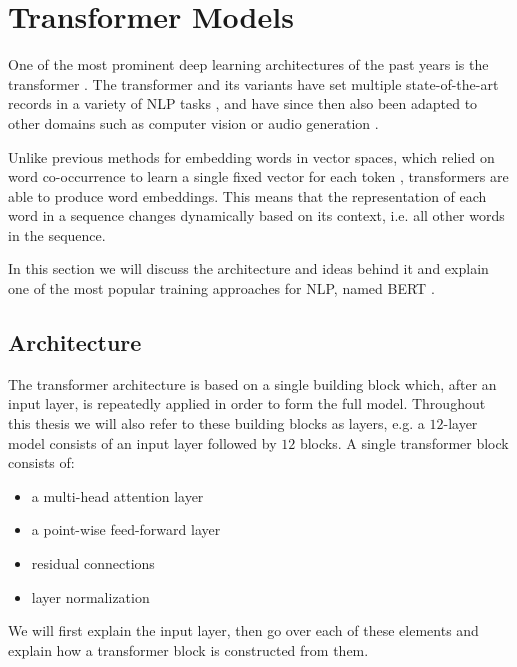 \section{Transformer Models}
One of the most prominent deep learning architectures of the past years is the transformer \cite{vaswani2017attention}. The transformer and its variants have set multiple state-of-the-art records in a variety of NLP tasks \cite{devlin-etal-2019-bert, DBLP:journals/corr/abs-1907-11692, DBLP:journals/corr/abs-2003-10555, DBLP:journals/corr/abs-1909-08053, DBLP:journals/corr/abs-2005-14165}, and have since then also been adapted to other domains such as computer vision \cite{DBLP:journals/corr/abs-2010-11929} or audio generation \cite{https://doi.org/10.48550/arxiv.2005.00341}.

Unlike previous methods for embedding words in vector spaces, which relied on word co-occurrence to learn a single fixed vector for each token \cite{pennington2014glove, DBLP:journals/corr/abs-1301-3781}, transformers are able to produce  word embeddings. This means that the representation of each word in a sequence changes dynamically based on its context, i.e. all other words in the sequence.

In this section we will discuss the architecture and ideas behind it and explain one of the most popular training approaches for NLP, named BERT \cite{devlin-etal-2019-bert}.

\subsection{Architecture}
The transformer architecture is based on a single building block which, after an input layer, is repeatedly applied in order to form the full model. Throughout this thesis we will also refer to these building blocks as layers, e.g. a $12$-layer model consists of an input layer followed by $12$ blocks. A single transformer block consists of:
\begin{itemize}
    \item a multi-head attention layer
    \item a point-wise feed-forward layer
    \item residual connections
    \item layer normalization
\end{itemize}
We will first explain the input layer, then go over each of these elements and explain how a transformer block is constructed from them.

